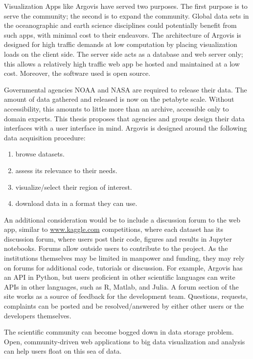 Visualization Apps like Argovis have served two purposes. The first purpose is to serve the community; the second is to expand the community. Global data sets in the oceanographic and earth science disciplines could potentially benefit from such apps, with minimal cost to their endeavors. The architecture of Argovis is designed for high traffic demands at low computation by placing visualization loads on the client side. The server side acts as a database and web server only; this allows a relatively high traffic web app be hosted and maintained at a low cost. Moreover, the software used is open source. 

Governmental agencies NOAA and NASA are required to release their data. The amount of data gathered and released is now on the petabyte scale. Without accessibility, this amounts to little more than an archive, accessible only to domain experts. This thesis proposes that agencies and groups design their data interfaces with a user interface in mind. Argovis is designed around the following data acquisition procedure: 
\begin{enumerate}
  \item browse datasets. 
  \item assess its relevance to their needs.
  \item visualize/select their region of interest.
  \item download data in a format they can use.
\end{enumerate}
An additional consideration would be to include a discussion forum to the web app, similar to \url{www.kaggle.com} \cite{kaggle} competitions, where each dataset has its discussion forum, where users post their code, figures and results in \gls{Jupyter} notebooks. Forums allow outside users to contribute to the project. As the institutions themselves may be limited in manpower and funding, they may rely on forums for additional code, tutorials or discussion. For example, Argovis has an API in Python, but users proficient in other scientific languages can write APIs in other languages, such as R, Matlab, and Julia. A forum section of the site works as a source of feedback for the development team. Questions, requests, complaints can be posted and be resolved/answered by either other users or the developers themselves.

The scientific community can become bogged down in data storage problem. Open, community-driven web applications to big data visualization and analysis can help users float on this sea of data.